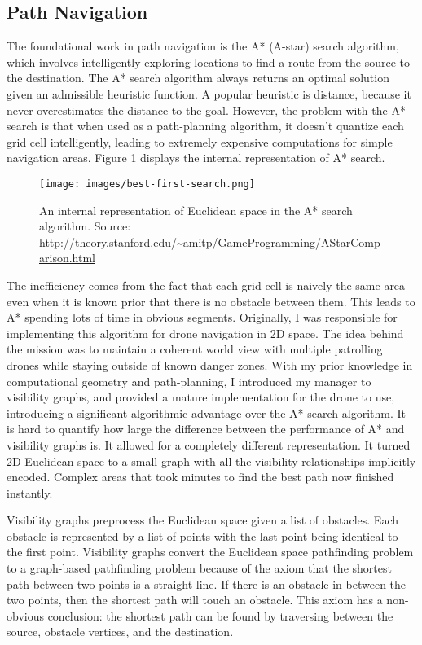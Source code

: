 \documentclass[12pt]{article}
\begin{document}
\subsection{Path Navigation}
The foundational work in path navigation is the A* (A-star) search algorithm, which involves intelligently exploring locations to find a route from the source to the destination. \cite{hartFormalBasisHeuristic1968} The A* search algorithm always returns an optimal solution given an admissible heuristic function. A popular heuristic is distance, because it never overestimates the distance to the goal. However, the problem with the A* search is that when used as a path-planning algorithm, it doesn't quantize each grid cell intelligently, leading to extremely expensive computations for simple navigation areas. Figure 1 displays the internal representation of A* search.
\begin{figure}[h]
    \centering
    \texttt{[image: images/best-first-search.png]}
    \caption{An internal representation of Euclidean space in the A* search algorithm. Source: \url{http://theory.stanford.edu/~amitp/GameProgramming/AStarComparison.html}}
    \label{fig:astar}
\end{figure}

The inefficiency comes from the fact that each grid cell is naively the same area even when it is known prior that there is no obstacle between them. This leads to A* spending lots of time in obvious segments. Originally, I was responsible for implementing this algorithm for drone navigation in 2D space. The idea behind the mission was to maintain a coherent world view with multiple patrolling drones while staying outside of known danger zones. With my prior knowledge in computational geometry and path-planning, I introduced my manager to visibility graphs, and provided a mature implementation for the drone to use, introducing a significant algorithmic advantage over the A* search algorithm. It is hard to quantify how large the difference between the performance of A* and visibility graphs is. It allowed for a completely different representation. It turned 2D Euclidean space to a small graph with all the visibility relationships implicitly encoded. Complex areas that took minutes to find the best path now finished instantly.

Visibility graphs preprocess the Euclidean space given a list of obstacles. \cite{lozano-perezAlgorithmPlanningCollisionfree1979} Each obstacle is represented by a list of points with the last point being identical to the first point. Visibility graphs convert the Euclidean space pathfinding problem to a graph-based pathfinding problem because of the axiom that the shortest path between two points is a straight line. If there is an obstacle in between the two points, then the shortest path will touch an obstacle. This axiom has a non-obvious conclusion: the shortest path can be found by traversing between the source, obstacle vertices, and the destination.
\end{document}

